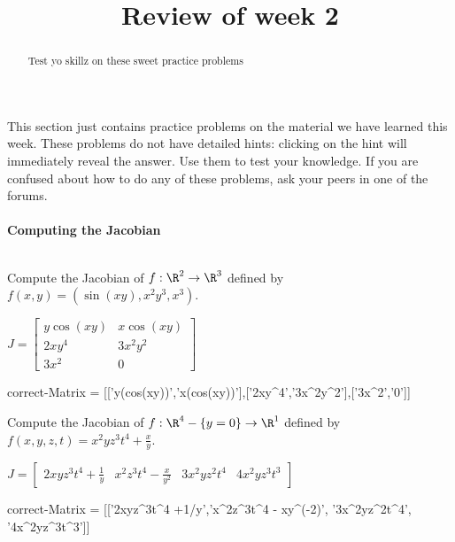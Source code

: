 \documentclass{ximera}
\title{Review of week 2}
\begin{document}
	\begin{abstract}
		Test yo skillz on these sweet practice problems
	\end{abstract}
	
	This section just contains practice problems on the material we have learned this week.  These problems do not have detailed hints:  clicking on the hint will
	immediately reveal the answer.  Use them to test your knowledge.  If you are confused about how to do any of these problems, ask your peers in one of the forums.
	\\
	\\
	\textbf{Computing the Jacobian}
	\\
	\\
	\begin{question}	
		Compute the Jacobian of $f:\R^2 \to \R^3$ defined by $f(x,y) = (\sin(xy),x^2y^3, x^3)$.
		\begin{solution}
		\begin{hint}
			\(J = \begin{bmatrix} y\cos(xy) & x\cos(xy) \\ 2xy^4 & 3x^2y^2 \\ 3x^2 & 0 \end{bmatrix}\)
		\end{hint}
		\begin{matrix-answer}[name=J]
			correct-Matrix  = [['y(cos(xy))','x(cos(xy))'],['2xy^4','3x^2y^2'],['3x^2','0']]
		\end{matrix-answer}
		\end{solution}
	\end{question}
	
	\begin{question}	
		Compute the Jacobian of $f:\R^4 - \{y=0\} \to \R^1$ defined by $f(x,y,z,t) = x^2yz^3t^4+\frac{x}{y}$.
		\begin{solution}
		\begin{hint}
			\(J = \begin{bmatrix} 2xyz^3t^4 +\frac{1}{y} & x^2z^3t^4 - \frac{x}{y^2} & 3x^2yz^2t^4 & 4x^2yz^3t^3\end{bmatrix}\)
		\end{hint}
		\begin{matrix-answer}[name=J]
			correct-Matrix  = [['2xyz^3t^4 +1/y','x^2z^3t^4 - xy^(-2)', '3x^2yz^2t^4', '4x^2yz^3t^3']]
		\end{matrix-answer}
		\end{solution}
	\end{question}
	
\end{document}
